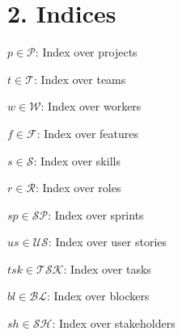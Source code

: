 \documentclass[12pt]{article}
\begin{document}
\section{2. Indices}
\item $ p \in \mathcal{P} $: Index over projects
    \item $ t \in \mathcal{T} $: Index over teams
    \item $ w \in \mathcal{W} $: Index over workers
    \item $ f \in \mathcal{F} $: Index over features
    \item $ s \in \mathcal{S} $: Index over skills
    \item $ r \in \mathcal{R} $: Index over roles
    \item $ sp \in \mathcal{SP} $: Index over sprints
    \item $ us \in \mathcal{US} $: Index over user stories
    \item $ tsk \in \mathcal{TSK} $: Index over tasks
    \item $ bl \in \mathcal{BL} $: Index over blockers
    \item $ sh \in \mathcal{SH} $: Index over stakeholders
\end{document}
